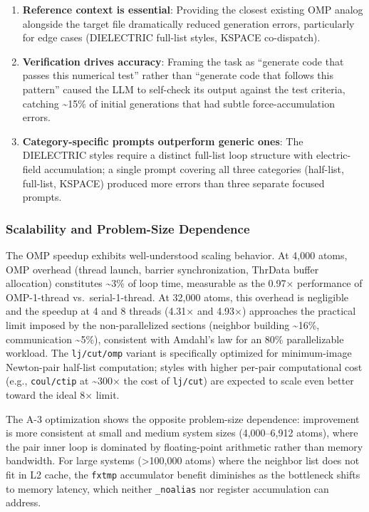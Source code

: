 \documentclass[
  11pt,
]{article}
\begin{document}
\begin{enumerate}
\def\labelenumi{\arabic{enumi}.}
\item
  \textbf{Reference context is essential}: Providing the closest
  existing OMP analog alongside the target file dramatically reduced
  generation errors, particularly for edge cases (DIELECTRIC full-list
  styles, KSPACE co-dispatch).
\item
  \textbf{Verification drives accuracy}: Framing the task as ``generate
  code that passes this numerical test'' rather than ``generate code
  that follows this pattern'' caused the LLM to self-check its output
  against the test criteria, catching \textasciitilde15\% of initial
  generations that had subtle force-accumulation errors.
\item
  \textbf{Category-specific prompts outperform generic ones}: The
  DIELECTRIC styles require a distinct full-list loop structure with
  electric-field accumulation; a single prompt covering all three
  categories (half-list, full-list, KSPACE) produced more errors than
  three separate focused prompts.
\end{enumerate}

\subsubsection{Scalability and Problem-Size
Dependence}\label{scalability-and-problem-size-dependence}

The OMP speedup exhibits well-understood scaling behavior. At 4,000
atoms, OMP overhead (thread launch, barrier synchronization, ThrData
buffer allocation) constitutes \textasciitilde3\% of loop time,
measurable as the 0.97× performance of OMP-1-thread vs.~serial-1-thread.
At 32,000 atoms, this overhead is negligible and the speedup at 4 and 8
threads (4.31× and 4.93×) approaches the practical limit imposed by the
non-parallelized sections (neighbor building \textasciitilde16\%,
communication \textasciitilde5\%), consistent with Amdahl's law for an
80\% parallelizable workload. The \texttt{lj/cut/omp} variant is
specifically optimized for minimum-image Newton-pair half-list
computation; styles with higher per-pair computational cost (e.g.,
\texttt{coul/ctip} at \textasciitilde300× the cost of \texttt{lj/cut})
are expected to scale even better toward the ideal 8× limit.

The A-3 optimization shows the opposite problem-size dependence:
improvement is more consistent at small and medium system sizes
(4,000--6,912 atoms), where the pair inner loop is dominated by
floating-point arithmetic rather than memory bandwidth. For large
systems (\textgreater100,000 atoms) where the neighbor list does not fit
in L2 cache, the \texttt{fxtmp} accumulator benefit diminishes as the
bottleneck shifts to memory latency, which neither \texttt{\_noalias}
nor register accumulation can address.
\end{document}
